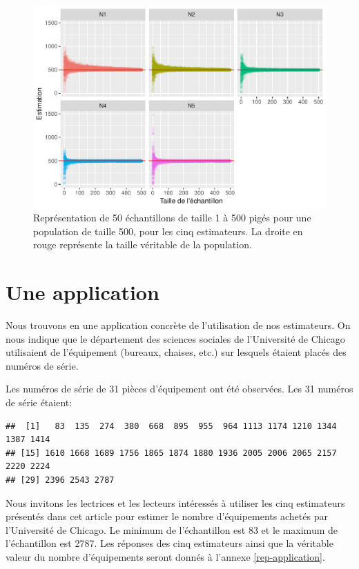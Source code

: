 \documentclass[10pt]{article}
\begin{document}
\begin{figure}[!htb]

{\centering \includegraphics[width=0.9\linewidth]{serial_number_amq_files/figure-latex/pop-1-500-1} 

}

\caption{Représentation de 50 échantillons de taille 1 à 500 pigés pour une population de taille 500, pour les cinq estimateurs. La droite en rouge représente la taille véritable de la population.}\label{fig:pop-1-500}
\end{figure}

\hypertarget{une-application}{%
\section{\texorpdfstring{Une application
\label{application}}{Une application }}\label{une-application}}

Nous trouvons en \cite{Goodman1954} une application concrète de
l'utilisation de nos estimateurs. On nous indique que le département des
sciences sociales de l'Université de Chicago utilisaient de l'équipement
(bureaux, chaises, etc.) sur lesquels étaient placés des numéros de
série.

Les numéros de série de 31 pièces d'équipement ont été observées. Les 31
numéros de série étaient:

\begin{verbatim}
##  [1]   83  135  274  380  668  895  955  964 1113 1174 1210 1344 1387 1414
## [15] 1610 1668 1689 1756 1865 1874 1880 1936 2005 2006 2065 2157 2220 2224
## [29] 2396 2543 2787
\end{verbatim}

Nous invitons les lectrices et les lecteurs intéressés à utiliser les
cinq estimateurs présentés dans cet article pour estimer le nombre
d'équipements achetés par l'Université de Chicago. Le minimum de
l'échantillon est 83 et le maximum de l'échantillon est 2787. Les
réponses des cinq estimateurs ainsi que la véritable valeur du nombre
d'équipements seront donnés à l'annexe \ref{rep-application}.
\end{document}
